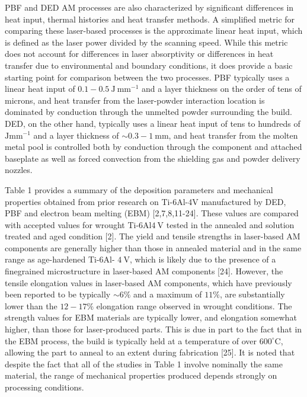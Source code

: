 \documentclass[10pt]{article}
\begin{document}
PBF and DED AM processes are also characterized by significant differences in heat input, thermal histories and heat transfer methods. A simplified metric for comparing these laser-based processes is the approximate linear heat input, which is defined as the laser power divided by the scanning speed. While this metric does not account for differences in laser absorptivity or differences in heat transfer due to environmental and boundary conditions, it does provide a basic starting point for comparison between the two processes. PBF typically uses a linear heat input of $0.1-0.5 \mathrm{~J} \mathrm{~mm}^{-1}$ and a layer thickness on the order of tens of microns, and heat transfer from the laser-powder interaction location is dominated by conduction through the unmelted powder surrounding the build. DED, on the other hand, typically uses a linear heat input of tens to hundreds of $\mathrm{J} \mathrm{mm}^{-1}$ and a layer thickness of $\sim 0.3-1 \mathrm{~mm}$, and heat transfer from the molten metal pool is controlled both by conduction through the component and attached baseplate as well as forced convection from the shielding gas and powder delivery nozzles.

Table 1 provides a summary of the deposition parameters and mechanical properties obtained from prior research on Ti-6Al-4V manufactured by DED, PBF and electron beam melting (EBM) [2,7,8,11-24]. These values are compared with accepted values for wrought Ti-6Al$4 \mathrm{~V}$ tested in the annealed and solution treated and aged condition [2]. The yield and tensile strengths in laser-based AM components are generally higher than those in annealed material and in the same range as age-hardened Ti-6Al- $4 \mathrm{~V}$, which is likely due to the presence of a finegrained microstructure in laser-based AM components [24]. However, the tensile elongation values in laser-based AM components, which have previously been reported to be typically $\sim 6 \%$ and a maximum of $11 \%$, are substantially lower than the $12-17 \%$ elongation range observed in wrought conditions. The strength values for EBM materials are typically lower, and elongation somewhat higher, than those for laser-produced parts. This is due in part to the fact that in the EBM process, the build is typically held at a temperature of over $600^{\circ} \mathrm{C}$, allowing the part to anneal to an extent during fabrication [25]. It is noted that despite the fact that all of the studies in Table 1 involve nominally the same material, the range of mechanical properties produced depends strongly on processing conditions.
\end{document}
